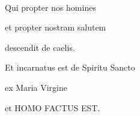 \documentclass[12pt,a4paper]{article}
\begin{document}
\thispagestyle{empty}

\pagestyle{empty}

\ 

\quad

\vfill

\bigskip

Qui propter nos homines

et propter nostram salutem

descendit de caelis.

Et incarnatus est de Spiritu Sancto

ex Maria Virgine

et HOMO FACTUS EST.

\eject
\end{document}
